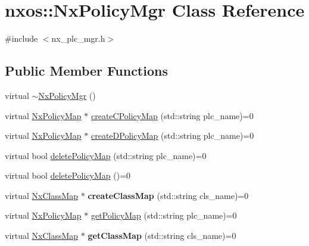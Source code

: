 \hypertarget{classnxos_1_1NxPolicyMgr}{\section{nxos\-:\-:Nx\-Policy\-Mgr Class Reference}
\label{classnxos_1_1NxPolicyMgr}
}


{\ttfamily \#include $<$nx\-\_\-plc\-\_\-mgr.\-h$>$}

\subsection*{Public Member Functions}
\begin{DoxyCompactItemize}
\item 
virtual \hyperlink{classnxos_1_1NxPolicyMgr_a6e5cd44714de60079ab8fa62bf4295ba}{$\sim$\-Nx\-Policy\-Mgr} ()
\item 
virtual \hyperlink{classnxos_1_1NxPolicyMap}{Nx\-Policy\-Map} $\ast$ \hyperlink{classnxos_1_1NxPolicyMgr_a307009f108803976613f95937c967671}{create\-C\-Policy\-Map} (std\-::string plc\-\_\-name)=0
\item 
virtual \hyperlink{classnxos_1_1NxPolicyMap}{Nx\-Policy\-Map} $\ast$ \hyperlink{classnxos_1_1NxPolicyMgr_a5c468c9d5889323f895d3d68a5890954}{create\-D\-Policy\-Map} (std\-::string plc\-\_\-name)=0
\item 
virtual bool \hyperlink{classnxos_1_1NxPolicyMgr_ae77ad299e78ec7d040e28d339bca5697}{delete\-Policy\-Map} (std\-::string plc\-\_\-name)=0
\item 
virtual bool \hyperlink{classnxos_1_1NxPolicyMgr_a9a5619c35545f96bb968b8b7de03d4b3}{delete\-Policy\-Map} ()=0
\item 
\hypertarget{classnxos_1_1NxPolicyMgr_a257d0113ea32c836b6beb77f06cc7e23}{virtual \hyperlink{classnxos_1_1NxClassMap}{Nx\-Class\-Map} $\ast$ {\bfseries create\-Class\-Map} (std\-::string cls\-\_\-name)=0}\label{classnxos_1_1NxPolicyMgr_a257d0113ea32c836b6beb77f06cc7e23}

\item 
virtual \hyperlink{classnxos_1_1NxPolicyMap}{Nx\-Policy\-Map} $\ast$ \hyperlink{classnxos_1_1NxPolicyMgr_aff61d80788c9a038aeadacc5eef27ebf}{get\-Policy\-Map} (std\-::string plc\-\_\-name)=0
\item 
\hypertarget{classnxos_1_1NxPolicyMgr_aeaeff455590a09c0930b7e9bc5eafe08}{virtual \hyperlink{classnxos_1_1NxClassMap}{Nx\-Class\-Map} $\ast$ {\bfseries get\-Class\-Map} (std\-::string cls\-\_\-name)=0}\label{classnxos_1_1NxPolicyMgr_aeaeff455590a09c0930b7e9bc5eafe08}

\end{DoxyCompactItemize}



